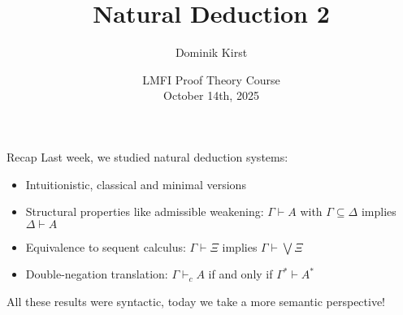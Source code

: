 \documentclass[xcolor=dvipsnames,aspectratio=169,handout]{beamer}
\title[Natural Deduction 2]{Natural Deduction 2}
\author[Dominik Kirst]{Dominik Kirst}
\date[October 14th, 2025]{LMFI Proof Theory Course\\October 14th, 2025}
\begin{document}

\newcommand\refs[1]{%
	\begin{textblock*}{8cm}(0.3cm,9.2cm)%
		\scriptsize {\color{gray}#1}
	\end{textblock*}
}

\begin{frame}
	\maketitle
\end{frame}


\begin{frame}{Recap}
	Last week, we studied natural deduction systems:
	\begin{itemize}
		\vspace{0.3cm}
		\item
		Intuitionistic, classical and minimal versions
		\vspace{0.3cm}
		\item
		Structural properties like admissible weakening: $\Gamma\vdash A$ with $\Gamma\subseteq \Delta$ implies $\Delta \vdash A$
		\vspace{0.3cm}
		\item
		Equivalence to sequent calculus: $\Gamma\vdash \Xi$ implies $\Gamma \vdash \bigvee \Xi$
		\vspace{0.3cm}
		\item
		Double-negation translation: $\Gamma\vdash_c A$ if and only if $\Gamma^*\vdash A^*$
	\end{itemize}
	\vspace{0.3cm}
	All these results were syntactic, today we take a more semantic perspective!
\end{frame}
\end{document}
